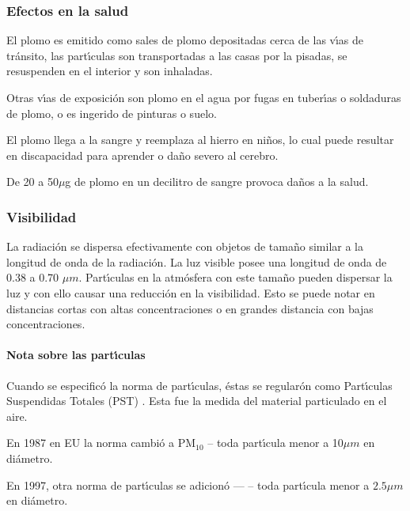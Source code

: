 \subsubsection{Efectos en la salud}
El plomo es emitido como sales de plomo depositadas cerca de las v\'{\i}as de tr\'ansito, las
part\'{\i}culas son transportadas a las casas por la pisadas, se resuspenden en el
interior y son inhaladas.

Otras v\'{\i}as de exposici\'on son plomo en el agua por fugas en tuber\'{\i}as o
soldaduras de plomo,  o es ingerido de pinturas o suelo.

El plomo llega a la sangre y reemplaza al hierro en ni\~nos, lo cual puede resultar en
discapacidad para aprender o da\~no severo al cerebro.

De 20 a 50$\mu$g de plomo en un decilitro de sangre provoca da\~nos a la salud.

\subsubsection{Visibilidad}

La radiaci\'on se dispersa efectivamente con objetos de tama\~no similar a la longitud
de onda de la radiaci\'on. La luz visible posee una longitud de onda de 0.38 a 0.70
$\mu m$. Part\'{\i}culas en la atm\'osfera con este tama\~no pueden dispersar la luz y
con ello causar una reducci\'on en la visibilidad. Esto se puede notar en distancias
cortas con altas concentraciones o en grandes distancia con bajas concentraciones.
\paragraph{Nota sobre las part\'{\i}culas}
Cuando se especific\'o la norma de part\'{\i}culas, \'estas se regular\'on como Part\'{\i}culas Suspendidas Totales (PST) . Esta fue la medida del material particulado en el aire.

En 1987 en EU la norma cambi\'o a PM$_{10}$ -- toda part\'{\i}cula menor a 10$\mu m$ en di\'ametro.

En 1997, otra norma de part\'{\i}culas se adicion\'o ---  -- toda part\'{\i}cula menor a $2.5\mu m$ en di\'ametro.

